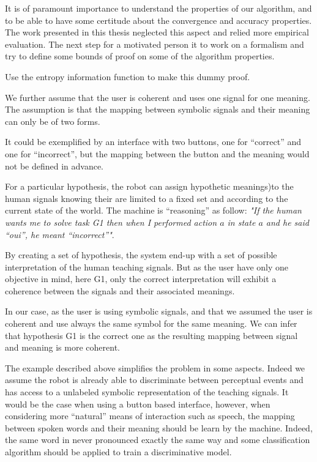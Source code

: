 It is of paramount importance to understand the properties of our algorithm, and to be able to have some certitude about the convergence and accuracy properties. The work presented in this thesis neglected this aspect and relied more empirical evaluation. The next step for a motivated person it to work on a formalism and try to define some bounds of proof on some of the algorithm properties.

Use the entropy information function to make this dummy proof.

We further assume that the user is coherent and uses one signal for one meaning. The assumption is that the mapping between symbolic signals and their meaning can only be of two forms.

It could be exemplified by an interface with two buttons, one for ``correct'' and one for ``incorrect'', but the mapping between the button and the meaning would not be defined in advance.


For a particular hypothesis, the robot can assign hypothetic meanings)to the human signals knowing their are limited to a fixed set and according to the current state of the world. The machine is ``reasoning'' as follow: \emph{"If the human wants me to solve task G1 then when I performed action $a$ in state $a$ and he said ``oui'', he meant ``incorrect''"}. 


By creating a set of hypothesis, the system end-up with a set of possible interpretation of the human teaching signals. But as the user have only one objective in mind, here G1, only the correct interpretation will exhibit a coherence between the signals and their associated meanings. 

In our case, as the user is using symbolic signals, and that we assumed the user is coherent and use always the same symbol for the same meaning. We can infer that hypothesis G1 is the correct one as the resulting mapping between signal and meaning is more coherent.


The example described above simplifies the problem in some aspects. Indeed we assume the robot is already able to discriminate between perceptual events and has access to a unlabeled symbolic representation of the teaching signals. It would be the case when using a button based interface, however, when considering more ``natural'' means of interaction such as speech, the mapping between spoken words and their meaning should be learn by the machine. Indeed, the same word in never pronounced exactly the same way and some classification algorithm should be applied to train a discriminative model.


